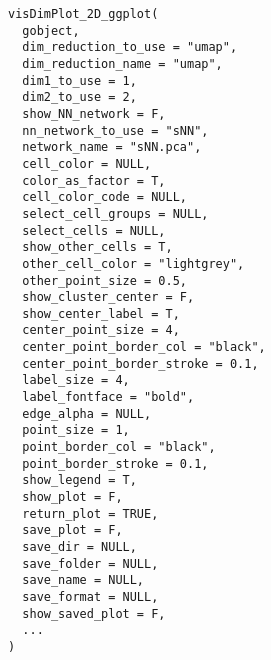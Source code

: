 \documentclass[a4paper]{book}
\begin{document}
\begin{Usage}
\begin{verbatim}
visDimPlot_2D_ggplot(
  gobject,
  dim_reduction_to_use = "umap",
  dim_reduction_name = "umap",
  dim1_to_use = 1,
  dim2_to_use = 2,
  show_NN_network = F,
  nn_network_to_use = "sNN",
  network_name = "sNN.pca",
  cell_color = NULL,
  color_as_factor = T,
  cell_color_code = NULL,
  select_cell_groups = NULL,
  select_cells = NULL,
  show_other_cells = T,
  other_cell_color = "lightgrey",
  other_point_size = 0.5,
  show_cluster_center = F,
  show_center_label = T,
  center_point_size = 4,
  center_point_border_col = "black",
  center_point_border_stroke = 0.1,
  label_size = 4,
  label_fontface = "bold",
  edge_alpha = NULL,
  point_size = 1,
  point_border_col = "black",
  point_border_stroke = 0.1,
  show_legend = T,
  show_plot = F,
  return_plot = TRUE,
  save_plot = F,
  save_dir = NULL,
  save_folder = NULL,
  save_name = NULL,
  save_format = NULL,
  show_saved_plot = F,
  ...
)
\end{verbatim}
\end{Usage}
%
\end{document}
